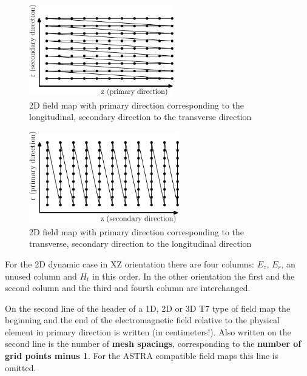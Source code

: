 \begin{figure}[ht]
  \begin{center}
    \includegraphics[origin=bl,height=40mm,angle=0]{./figures/Fieldmaps/order-1.pdf}
    \caption[Order of field values in a 2D field map in XZ orientation]{2D field map with primary direction corresponding to the longitudinal, secondary direction to the transverse direction}
    \label{fig:order1}
  \end{center}
\end{figure}

\begin{figure}[ht]
  \begin{center}
    \includegraphics[origin=bl,height=40mm,angle=0]{./figures/Fieldmaps/order-2.pdf}
    \caption[Order of field values in a 2D field map in ZX orientation]{2D field map with primary direction corresponding to the transverse, secondary direction to the longitudinal direction}
    \label{fig:order2}
  \end{center}
\end{figure}

For the 2D dynamic case in XZ orientation there are four columns: $E_z$, $E_r$, an unused column and $H_t$ in this order. In the other orientation the first and the second column and the third and fourth column are interchanged.

On the second line of the header of a 1D, 2D or 3D T7 type of field map the beginning and the end of the electromagnetic field relative to the physical element in primary direction is written (in centimeters!). Also written on the second line is the number of {\bf mesh spacings}, corresponding to the {\bf number of grid points minus 1}. For the ASTRA compatible field maps this line is omitted.

